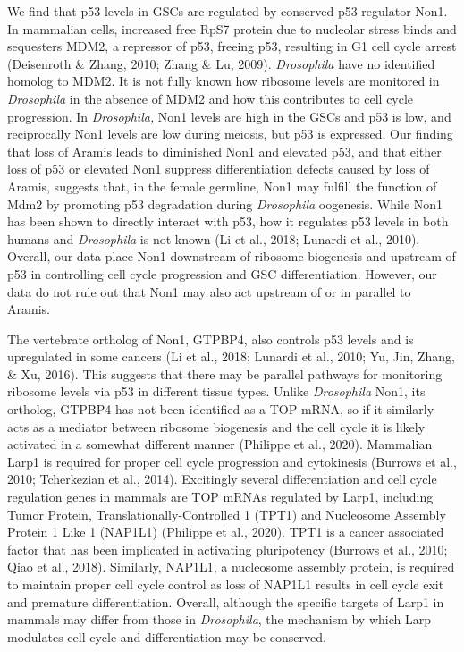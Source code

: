 \documentclass[12pt,twoside]{reedthesis}
\begin{document}
We find that p53 levels in GSCs are regulated by conserved p53 regulator
Non1. In mammalian cells, increased free RpS7 protein due to nucleolar
stress binds and sequesters MDM2, a repressor of p53, freeing p53,
resulting in G1 cell cycle arrest (Deisenroth \& Zhang, 2010; Zhang \& Lu, 2009). \emph{Drosophila} have no identified
homolog to MDM2. It is not fully known how ribosome levels are monitored
in \emph{Drosophila} in the absence of MDM2 and how this contributes to cell
cycle progression. In \emph{Drosophila,} Non1 levels are high in the GSCs and
p53 is low, and reciprocally Non1 levels are low during meiosis, but p53
is expressed. Our finding that loss of Aramis leads to diminished Non1
and elevated p53, and that either loss of p53 or elevated Non1 suppress
differentiation defects caused by loss of Aramis, suggests that, in the
female germline, Non1 may fulfill the function of Mdm2 by promoting p53
degradation during \emph{Drosophila} oogenesis. While Non1 has been shown to
directly interact with p53, how it regulates p53 levels in both humans
and \emph{Drosophila} is not known (Li et al., 2018; Lunardi et al., 2010). Overall,
our data place Non1 downstream of ribosome biogenesis and upstream of
p53 in controlling cell cycle progression and GSC differentiation.
However, our data do not rule out that Non1 may also act upstream of or
in parallel to Aramis.

The vertebrate ortholog of Non1, GTPBP4, also controls p53 levels and is
upregulated in some cancers (Li et al., 2018; Lunardi et al., 2010; Yu, Jin, Zhang, \& Xu, 2016). This suggests that there may be
parallel pathways for monitoring ribosome levels via p53 in different
tissue types. Unlike \emph{Drosophila} Non1, its ortholog, GTPBP4 has not
been identified as a TOP mRNA, so if it similarly acts as a mediator
between ribosome biogenesis and the cell cycle it is likely activated in
a somewhat different manner (Philippe et al., 2020).
Mammalian Larp1 is required for proper cell cycle progression and
cytokinesis (Burrows et al., 2010; Tcherkezian et al., 2014).
Excitingly several differentiation and cell cycle regulation genes in
mammals are TOP mRNAs regulated by Larp1, including Tumor Protein,
Translationally-Controlled 1 (TPT1) and Nucleosome Assembly Protein 1
Like 1 (NAP1L1) (Philippe et al., 2020). TPT1 is a cancer
associated factor that has been implicated in activating pluripotency
(Burrows et al., 2010; Qiao et al., 2018).
Similarly, NAP1L1, a nucleosome assembly protein, is required to
maintain proper cell cycle control as loss of NAP1L1 results in cell
cycle exit and premature differentiation. Overall, although the specific
targets of Larp1 in mammals may differ from those in \emph{Drosophila}, the
mechanism by which Larp modulates cell cycle and differentiation may be
conserved.
\end{document}
